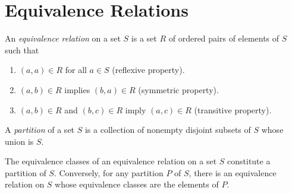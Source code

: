 \section{Equivalence Relations}

\begin{definition}
	An \textit{equivalence relation} on a set $S$ is a set $R$ of ordered pairs of elements of $S$ such that

	\begin{enumerate}
		\item $(a, a) \in R$ for all $a \in S$  (reflexive property).
		\item $(a, b) \in R$ implies $(b, a) \in R$  (symmetric property).
		\item $(a, b) \in R$ and $(b, c) \in R$ imply $(a, c) \in R$  (transitive property).
	\end{enumerate}
\end{definition}

\begin{definition}[Partition]
	A \textit{partition} of a set $S$ is a collection of nonempty disjoint subsets of $S$ whose union is $S$.
\end{definition}

\begin{theorem}
	The equivalence classes of an equivalence relation on a set $S$ constitute a partition of $S$. Conversely, for any partition $P$ of $S$, there is an equivalence relation on $S$ whose equivalence classes are the elements of $P$.
\end{theorem}
